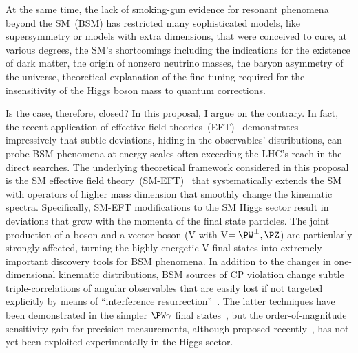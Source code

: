 \documentclass[a4paper,11pt]{article}
\renewcommand{\PV}{{{{V}}}\xspace}
\newcommand{\VH}{{{\PV}{\PH}}\xspace}
\begin{document}
At the same time, the lack of smoking-gun evidence for resonant phenomena beyond the SM~(BSM) has restricted many sophisticated models, like supersymmetry or models with extra dimensions, that were conceived to cure, at various degrees, the SM's shortcomings 
including the indications for the existence of dark matter, the origin of nonzero neutrino masses, the baryon asymmetry of the universe, theoretical explanation of the fine tuning required for the insensitivity of the Higgs boson mass to quantum corrections. 

Is the case, therefore, closed? 
In this proposal, I argue on the contrary. 
In fact, the recent application of effective field theories~(EFT)~\cite{Grinstein:1991cd,Chiu:2007dg,Passarino:2016pzb} demonstrates impressively that subtle deviations, hiding in the observables' distributions, can probe BSM phenomena at energy scales often exceeding the LHC's reach in the direct searches. 
The underlying theoretical framework considered in this proposal is the SM effective field theory~(SM-EFT)~\cite{Jenkins:2013zja,Alonso:2013hga,Jenkins:2013wua,Englert:2014cva,Brivio:2017vri} that systematically extends the SM with operators of higher mass dimension that smoothly change the kinematic spectra.
Specifically,  SM-EFT modifications to the SM Higgs sector result in deviations that grow with the momenta of the final state particles. 
The joint production of a \PH boson and a vector boson (\VH with \PV$=\PW^{\pm},\PZ$) are particularly strongly affected, turning the highly energetic \VH final states into extremely important discovery tools for BSM phenomena. 
In addition to the changes in one-dimensional kinematic distributions, 
BSM sources of CP violation change subtle triple-correlations of angular observables that are easily lost if not targeted explicitly by means of ``interference resurrection''~\cite{Panico:2017frx}.
The latter techniques have been demonstrated in the simpler $\PW\gamma$ final states~\cite{CMS-PAS-SMP-20-005}, but the order-of-magnitude sensitivity gain for precision measurements, although proposed recently~\cite{Banerjee:2019twi}, has not yet been exploited experimentally in the Higgs sector. 
\end{document}
